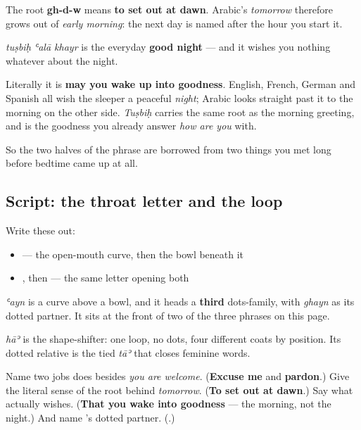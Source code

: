 The root \textbf{gh-d-w} means \textbf{to set out at dawn}. Arabic's \emph{tomorrow} therefore grows out of \emph{early morning}: the next day is named after the hour you start it.

\begin{culture}
\textbf{  } \emph{tuṣbiḥ ʿalā khayr} is the everyday \textbf{good night} — and it wishes you nothing whatever about the night.

Literally it is \textbf{may you wake up into goodness}. English, French, German and Spanish all wish the sleeper a peaceful \emph{night}; Arabic looks straight past it to the morning on the other side. \emph{Tuṣbiḥ} carries the same root as the morning greeting, and \textbf{} is the goodness you already answer \emph{how are you} with.

So the two halves of the phrase are borrowed from two things you met long before bedtime came up at all.
\end{culture}

\subsection*{Script: the throat letter and the loop}
Write these out:

\begin{itemize}
\raggedright
  \item \textbf{} — the open-mouth curve, then the bowl beneath it
  \item \textbf{}, then \textbf{} — the same letter opening both
\end{itemize}

\textbf{} \emph{ʿayn} is a curve above a bowl, and it heads a \textbf{third} dots-family, with \textbf{} \emph{ghayn} as its dotted partner. It sits at the front of two of the three phrases on this page.

\textbf{} \emph{hāʾ} is the shape-shifter: one loop, no dots, four different coats by position. Its dotted relative \textbf{} is the tied \emph{tāʾ} that closes feminine words.

\begin{tcolorbox}[breakable,colback=teal!4,colframe=teal!35!black,title={Before you move on}]
Name two jobs \textbf{} does besides \emph{you are welcome}. (\textbf{Excuse me} and \textbf{pardon}.) Give the literal sense of the root behind \emph{tomorrow}. (\textbf{To set out at dawn}.) Say what \textbf{  } actually wishes. (\textbf{That you wake into goodness} — the morning, not the night.) And name \textbf{}'s dotted partner. (\textbf{}.)
\end{tcolorbox}
